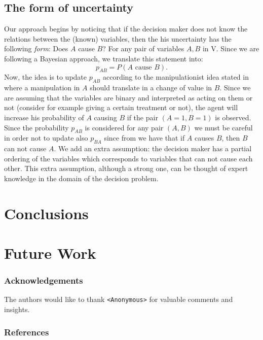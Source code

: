 \documentclass[letterpaper]{article}
\begin{document}
\subsection{The form of uncertainty}
Our approach begins by noticing that if the decision maker does not know the relations between the (known) variables, then the his uncertainty has the following \textit{form}: Does $A$ cause $B$? For any pair of variables $A,B$ in V. Since we are following a Bayesian approach, we translate this statement into:
\[p_{AB}=P(A \textrm{ cause } B). \]
Now, the idea is to update $p_{AB}$ according to the manipulationist idea stated in \cite{woodward2005making} where a manipulation in $A$ should translate in a change of value in $B$. Since we are assuming that the variables are binary and interpreted as acting on them or not (consider for example giving a certain treatment or not), the agent will increase his probability of $A$ causing $B$ if the pair $(A=1,B=1)$ is observed. Since the probability $p_{AB}$ is considered for any pair $(A,B)$ we must be careful in order not to update also $p_{BA}$ since from \cite{spirtes2000causation} we have that if $A$ causes $B$, then $B$ can not cause $A$. We add an extra assumption: the decision maker has a partial ordering of the variables which corresponds to variables that can not cause each other. This extra assumption, although a strong one, can be thought of expert knowledge in the domain of the decision problem. 

\section{Conclusions}

\section{Future Work}

\newpage

\subsubsection*{Acknowledgements}
The authors would like to thank \texttt{<Anonymous>} for valuable comments and insights. 


\subsubsection*{References}


\end{document}
